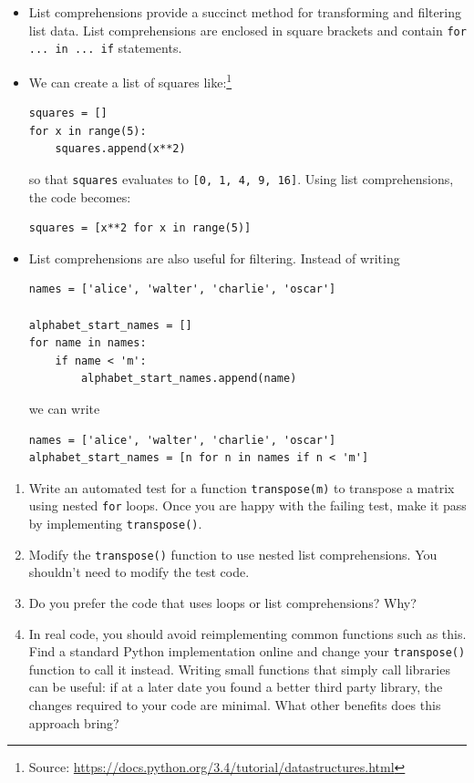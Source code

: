 \documentclass[a4paper,twoside,titlepage]{memoir}
\makeatletter
\newcommand{\FrameTitle}[2]{%
  \fboxrule=\FrameRule \fboxsep=\FrameSep
  \fbox{\vbox{\nobreak \vskip -0.7\FrameSep
    \rlap{\centerline{\strut#1}}\nobreak\nointerlineskip%
    \vskip 0.7\FrameSep
    \hbox{#2}}}}
\newenvironment{framewithtitle}[2][\FrameFirst@Lab\ (cont.)]{%
  \def\FrameFirst@Lab{\textbf{#2}}%
  \def\FrameCont@Lab{\textbf{#1}}%
  \def\FrameCommand##1{%
    \FrameTitle{\FrameFirst@Lab}{##1}}%
  \def\FirstFrameCommand##1{%
    \FrameTitle{\FrameFirst@Lab}{##1}}%
  \def\MidFrameCommand##1{%
    \FrameTitle{\FrameCont@Lab}{##1}}%
  \def\LastFrameCommand##1{%
    \FrameTitle{\FrameCont@Lab}{##1}}%
\MakeFramed{\advance\hsize-\width \FrameRestore}}%
{\endMakeFramed}
\newcounter{exercisectr}
\newenvironment{exercise}
{\stepcounter{exercisectr}\begin{framewithtitle}{Practical \arabic{exercisectr}}}
{\end{framewithtitle}}
\newcommand{\shellcmd}{\texttt}
\makeatother
\begin{document}
\begin{itemize}
	\item List comprehensions provide a succinct method for transforming and filtering list data.  List comprehensions are enclosed in square brackets and contain \shellcmd{for ... in ... if} statements.

	\item We can create a list of squares like:\footnote{Source: \url{https://docs.python.org/3.4/tutorial/datastructures.html}}
\begin{verbatim}
squares = []
for x in range(5):
	squares.append(x**2)
\end{verbatim}
so that \shellcmd{squares} evaluates to \shellcmd{[0, 1, 4, 9, 16]}.  Using list comprehensions, the code becomes:
\begin{verbatim}
squares = [x**2 for x in range(5)]
\end{verbatim}

	\item List comprehensions are also useful for filtering.  Instead of writing
\begin{verbatim}
names = ['alice', 'walter', 'charlie', 'oscar']

alphabet_start_names = []
for name in names:
	if name < 'm':
		alphabet_start_names.append(name)
\end{verbatim}
we can write
\begin{verbatim}
names = ['alice', 'walter', 'charlie', 'oscar']
alphabet_start_names = [n for n in names if n < 'm']
\end{verbatim}
\end{itemize}

\begin{exercise}
\begin{enumerate}
	\item Write an automated test for a function \shellcmd{transpose(m)} to transpose a matrix using nested \shellcmd{for} loops.  Once you are happy with the failing test, make it pass by implementing \shellcmd{transpose()}.  
	\item Modify the \shellcmd{transpose()} function to use nested list comprehensions.  You shouldn't need to modify the test code.
	\item Do you prefer the code that uses loops or list comprehensions?  Why?
	\item In real code, you should avoid reimplementing common functions such as this.  Find a standard Python implementation online and change your \shellcmd{transpose()} function to call it instead.  Writing small functions that simply call libraries can be useful: if at a later date you found a better third party library, the changes required to your code are minimal.  What other benefits does this approach bring? %
\end{enumerate}
\end{exercise}
\end{document}
